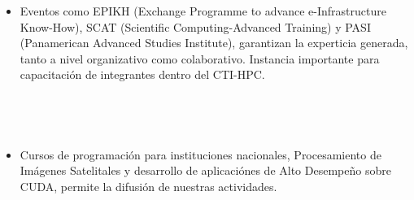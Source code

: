 \frame
{
\frametitle{}


\begin{columns}
\begin{itemize}
\item Eventos como EPIKH (Exchange Programme to advance e-Infrastructure Know-How), SCAT (Scientific Computing-Advanced Training) y PASI (Panamerican Advanced Studies Institute), garantizan 
la experticia generada, tanto a nivel organizativo como colaborativo. Instancia importante para capacitación de integrantes dentro del CTI-HPC. 
\end{itemize}
\end{columns}
}

\frame
{
\frametitle{}

\begin{columns}
\begin{itemize}
\item Cursos de programación para instituciones nacionales, Procesamiento de Imágenes Satelitales y desarrollo de aplicaciónes de Alto Desempeño sobre CUDA, permite la difusión de nuestras actividades.
\end{itemize}
\end{columns}

}

